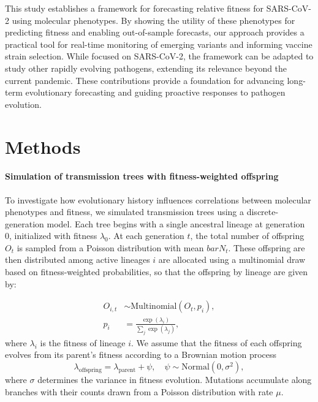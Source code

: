 This study establishes a framework for forecasting relative fitness for SARS-CoV-2 using molecular phenotypes.
By showing the utility of these phenotypes for predicting fitness and enabling out-of-sample forecasts, our approach provides a practical tool for real-time monitoring of emerging variants and informing vaccine strain selection. 
While focused on SARS-CoV-2, the framework can be adapted to study other rapidly evolving pathogens, extending its relevance beyond the current pandemic.
These contributions provide a foundation for advancing long-term evolutionary forecasting and guiding proactive responses to pathogen evolution.

\section{Methods}

\paragraph{Simulation of transmission trees with fitness-weighted offspring}%

To investigate how evolutionary history influences correlations between molecular phenotypes and fitness, we simulated transmission trees using a discrete-generation model.
Each tree begins with a single ancestral lineage at generation 0, initialized with fitness $\lambda_0$.
At each generation $t$, the total number of offspring $O_{t}$ is sampled from a Poisson distribution with mean $bar{N}_t$.
These offspring are then distributed among active lineages $i$ are allocated using a multinomial draw based on fitness-weighted probabilities, so that the offspring by lineage are given by:

\begin{align*}
    O_{i, t} &\sim \text{Multinomial}\left(O_t, p_{i}\right),\\
    p_i &= \frac{\exp(\lambda_i)}{\sum_j \exp(\lambda_j)},
\end{align*}
where $\lambda_i$ is the fitness of lineage $i$.
We assume that the fitness of each offspring evolves from its parent’s fitness according to a Brownian motion process
\begin{equation*}
    \lambda_{\text{offspring}} = \lambda_{\text{parent}} + \psi, \quad \psi \sim \text{Normal}(0, \sigma^2),
\end{equation*}
where $\sigma$ determines the variance in fitness evolution.
Mutations accumulate along branches with their counts drawn from a Poisson distribution with rate $\mu$.


